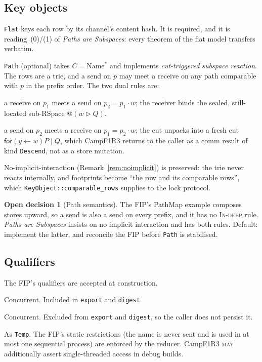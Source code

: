 \documentclass[11pt]{article}
\theoremstyle{plain}
\theoremstyle{definition}
\newtheorem{decision}{Open decision}
\newcommand{\Camp}{CampF1R3}
\newcommand{\MAY}{\textsc{may}}
\newcommand{\code}[1]{\texttt{#1}}
\begin{document}
\subsection{Key objects}

\code{Flat} keys each row by its channel's content hash. It is required, and it is
reading~(0)/(1) of \emph{Paths are Subspaces}: every theorem of the flat model transfers
verbatim.

\code{Path} (optional) takes $C=\mathrm{Name}^{*}$ and implements \emph{cut-triggered
subspace reaction}. The rows are a trie, and a send on $p$ may meet a receive on any
path comparable with $p$ in the prefix order. The two dual rules are:
\begin{description}[nosep,leftmargin=1.5em]
\item[\textsc{Out-deep}] a receive on $p_1$ meets a send on $p_2=p_1\cdot w$; the
  receiver binds the sealed, still-located sub-RSpace $@(w\rhd Q)$.
\item[\textsc{In-deep}] a send on $p_2$ meets a receive on $p_1=p_2\cdot w$; the cut
  unpacks into a fresh cut $\mathsf{for}(y\leftarrow w)P\mid Q$, which \Camp{} returns
  to the caller as a comm result of kind \code{Descend}, not as a store mutation.
\end{description}
No-implicit-interaction (Remark~\ref{rem:noimplicit}) is preserved: the trie never
reacts internally, and footprints become ``the row and its comparable rows'', which
\code{KeyObject::comparable\_rows} supplies to the lock protocol.

\begin{decision}[Path semantics]
The FIP's PathMap example composes stores upward, so a send is also a send on every
prefix, and it has no \textsc{In-deep} rule. \emph{Paths are Subspaces} insists on
no implicit interaction and has both rules. Default: implement the latter, and
reconcile the FIP before \code{Path} is stabilised.
\end{decision}

\subsection{Qualifiers}

The FIP's qualifiers are accepted at construction.
\begin{description}[nosep,leftmargin=1.5em]
\item[\code{Default}] Concurrent. Included in \code{export} and \code{digest}.
\item[\code{Temp}] Concurrent. Excluded from \code{export} and \code{digest}, so the
  caller does not persist it.
\item[\code{Seq}] As \code{Temp}. The FIP's static restrictions (the name is never sent
  and is used in at most one sequential process) are enforced by the reducer. \Camp{}
  \MAY{} additionally assert single-threaded access in debug builds.
\end{description}
\end{document}
